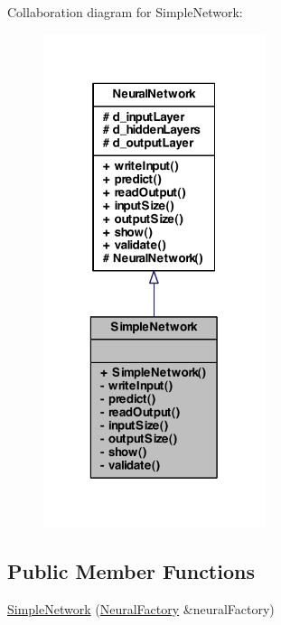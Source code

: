 Collaboration diagram for SimpleNetwork:
\nopagebreak
\begin{figure}[H]
\begin{center}
\leavevmode
\includegraphics[width=184pt]{class_simple_network__coll__graph}
\end{center}
\end{figure}
\subsection*{Public Member Functions}
\begin{DoxyCompactItemize}
\item 
\hyperlink{class_simple_network_a8371fd3be054537889207547e5e53e29}{SimpleNetwork} (\hyperlink{class_neural_factory}{NeuralFactory} \&neuralFactory)
\end{DoxyCompactItemize}
